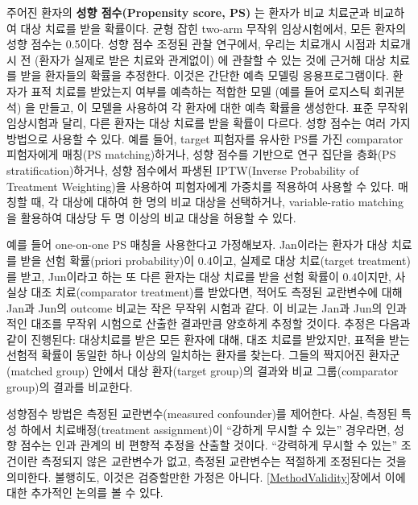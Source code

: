 \documentclass[11pt]{book}
\theoremstyle{definition}
\theoremstyle{definition}
\theoremstyle{definition}
\theoremstyle{remark}
\begin{document}
주어진 환자의 \textbf{성향 점수(Propensity score, PS)} 는 환자가 비교
치료군과 비교하여 대상 치료를 받을 확률이다. \citep{rosenbaum_1983} 균형
잡힌 two-arm 무작위 임상시험에서, 모든 환자의 성향 점수는 0.5이다. 성향
점수 조정된 관찰 연구에서, 우리는 치료개시 시점과 치료개시 전 (환자가
실제로 받은 치료와 관계없이) 에 관찰할 수 있는 것에 근거해 대상 치료를
받을 환자들의 확률을 추정한다. 이것은 간단한 예측 모델링
응용프로그램이다. 환자가 표적 치료를 받았는지 여부를 예측하는 적합한
모델 (예를 들어 로지스틱 회귀분석) 을 만들고, 이 모델을 사용하여 각
환자에 대한 예측 확률을 생성한다. 표준 무작위 임상시험과 달리, 다른
환자는 대상 치료를 받을 확률이 다르다. 성향 점수는 여러 가지 방법으로
사용할 수 있다. 예를 들어, target 피험자를 유사한 PS를 가진 comparator
피험자에게 매칭(PS matching)하거나, 성향 점수를 기반으로 연구 집단을
층화(PS stratification)하거나, 성향 점수에서 파생된 IPTW(Inverse
Probability of Treatment Weighting)을 사용하여 피험자에게 가중치를
적용하여 사용할 수 있다. 매칭할 때, 각 대상에 대하여 한 명의 비교 대상을
선택하거나, variable-ratio matching을 활용하여 대상당 두 명 이상의 비교
대상을 허용할 수 있다. \citep{rassen_2012} 

예를 들어 one-on-one PS 매칭을 사용한다고 가정해보자. Jan이라는 환자가
대상 치료를 받을 선험 확률(priori probability)이 0.4이고, 실제로 대상
치료(target treatment)를 받고, Jun이라고 하는 또 다른 환자는 대상 치료를
받을 선험 확률이 0.4이지만, 사실상 대조 치료(comparator treatment)를
받았다면, 적어도 측정된 교란변수에 대해 Jan과 Jun의 outcome 비교는 작은
무작위 시험과 같다. 이 비교는 Jan과 Jun의 인과적인 대조를 무작위
시험으로 산출한 결과만큼 양호하게 추정할 것이다. 추정은 다음과 같이
진행된다: 대상치료를 받은 모든 환자에 대해, 대조 치료를 받았지만, 표적을
받는 선험적 확률이 동일한 하나 이상의 일치하는 환자를 찾는다. 그들의
짝지어진 환자군(matched group) 안에서 대상 환자(target group)의 결과와
비교 그룹(comparator group)의 결과를 비교한다.

성향점수 방법은 측정된 교란변수(measured confounder)를 제어한다. 사실,
측정된 특성 하에서 치료배정(treatment assignment)이 ``강하게 무시할 수
있는'' 경우라면, 성향 점수는 인과 관계의 비 편향적 추정을 산출할 것이다.
``강력하게 무시할 수 있는'' 조건이란 측정되지 않은 교란변수가 없고,
측정된 교란변수는 적절하게 조정된다는 것을 의미한다. 불행히도, 이것은
검증할만한 가정은 아니다. \ref{MethodValidity}장에서 이에 대한 추가적인
논의를 볼 수 있다. 
\end{document}
